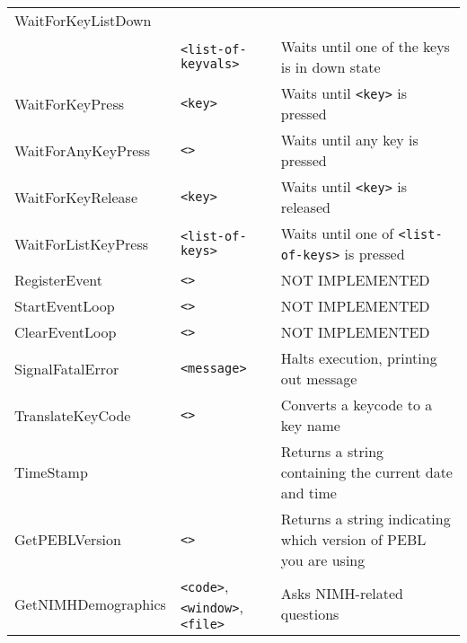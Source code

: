 \begin{longtable}{p{3cm}p{3cm}p{6cm}}
WaitForKeyListDown & & \\
 & \verb+<list-of-keyvals>+ & Waits until one of the keys is in down state\\
WaitForKeyPress   &\verb+<key>+            &Waits until \verb+<key>+ is pressed\\
WaitForAnyKeyPress&\hspace{0.5cm} \verb+<>+               &Waits until any key is pressed\\
WaitForKeyRelease &\hspace{0.5cm} \verb+<key>+    &	Waits until \verb+<key>+ is released\\
WaitForListKeyPress&\hspace{0.5cm}\verb+<list-of-keys>+ & Waits until one of \verb+<list-of-keys>+ is pressed \\
RegisterEvent  &\verb+<>+         &     NOT IMPLEMENTED\\
StartEventLoop &\verb+<>+         &  	NOT IMPLEMENTED\\
ClearEventLoop &\verb+<>+         &   	NOT IMPLEMENTED\\
SignalFatalError &\verb+<message>+ &	Halts execution, printing out message \\
TranslateKeyCode &\verb+<>+        &Converts a keycode to a key name\\
TimeStamp        &		   &Returns a string containing the current date and time\\
GetPEBLVersion   &\verb+<>+        &Returns a string indicating which version of PEBL you are using\\
GetNIMHDemographics& \hspace{0.7cm}\verb+<code>+, \verb+<window>+, \verb+<file>+ &  Asks NIMH-related questions\\


\end{longtable}
